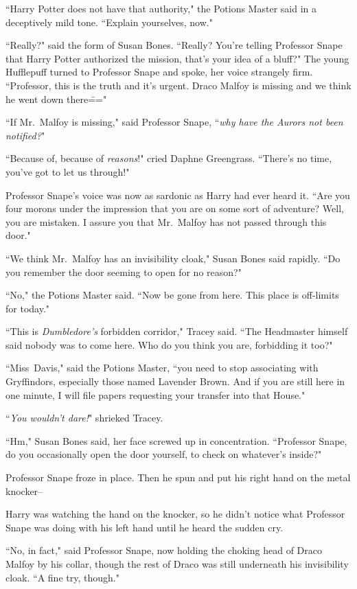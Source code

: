 ``Harry Potter does not have that authority," the Potions Master said in a deceptively mild tone. ``Explain yourselves, now."

``Really?" said the form of Susan Bones. ``Really? You're telling Professor Snape that Harry Potter authorized the mission, that's your idea of a bluff?" The young Hufflepuff turned to Professor Snape and spoke, her voice strangely firm. ``Professor, this is the truth and it's urgent. Draco Malfoy is missing and we think he went down there\==="

``If Mr.~Malfoy is missing," said Professor Snape, ``\emph{why have the Aurors not been notified?}"

``Because of, because of \emph{reasons}!" cried Daphne Greengrass. ``There's no time, you've got to let us through!"

Professor Snape's voice was now as sardonic as Harry had ever heard it. ``Are you four morons under the impression that you are on some sort of adventure? Well, you are mistaken. I assure you that Mr.~Malfoy has not passed through this door."

``We think Mr.~Malfoy has an invisibility cloak," Susan Bones said rapidly. ``Do you remember the door seeming to open for no reason?"

``No," the Potions Master said. ``Now be gone from here. This place is off-limits for today."

``This is \emph{Dumbledore's} forbidden corridor," Tracey said. ``The Headmaster himself said nobody was to come here. Who do you think you are, forbidding it too?"

``Miss~Davis," said the Potions Master, ``you need to stop associating with Gryffindors, especially those named Lavender Brown. And if you are still here in one minute, I will file papers requesting your transfer into that House."

``\emph{You wouldn't dare!}" shrieked Tracey.

``Hm," Susan Bones said, her face screwed up in concentration. ``Professor Snape, do you occasionally open the door yourself, to check on whatever's inside?"

Professor Snape froze in place. Then he spun and put his right hand on the metal knocker\---

Harry was watching the hand on the knocker, so he didn't notice what Professor Snape was doing with his left hand until he heard the sudden cry.

``No, in fact," said Professor Snape, now holding the choking head of Draco Malfoy by his collar, though the rest of Draco was still underneath his invisibility cloak. ``A fine try, though."

